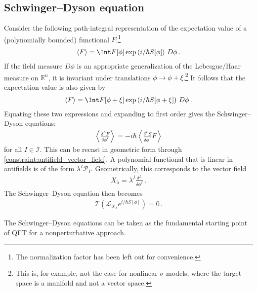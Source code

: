 \subsection{Schwinger--Dyson equation}

    Consider the following path-integral representation of the expectation value of a (polynomially bounded) functional $F$:\footnote{The normalization factor has been left out for convenience.}
    \begin{gather}
        \langle F\rangle = \Int F[\phi]\exp\left(i/\hbar S[\phi]\right)\,D\phi\,.
    \end{gather}
    If the field measure $D\phi$ is an appropriate generalization of the Lebesgue/Haar measure on $\mathbb{R}^n$, it is invariant under translations $\phi\longrightarrow\phi+\xi$.\footnote{This is, for example, not the case for nonlinear $\sigma$-models, where the target space is a manifold and not a vector space.} It follows that the expectation value is also given by
    \begin{gather}
        \langle F\rangle = \Int F[\phi+\xi]\exp\left(i/\hbar S[\phi+\xi]\right)\,D\phi\,.
    \end{gather}
    Equating these two expressions and expanding to first order gives the Schwinger--Dyson equations:
    \begin{gather}
        \label{qft:schwinger_dyson_equations}
        \left\langle\frac{\delta^LF}{\delta\phi^I}\right\rangle = -i\hbar\left\langle\frac{\delta^LS}{\delta\phi^I}F\right\rangle
    \end{gather}
    for all $I\in\mathcal{I}$. This can be recast in geometric form through \cref{constraint:antifield_vector_field}. A polynomial functional that is linear in antifields is of the form $\lambda^I\mathcal{P}_I$. Geometrically, this corresponds to the vector field
    \begin{gather}
        X_\lambda = \lambda^I\frac{\delta^L}{\delta\phi^I}\,.
    \end{gather}
    The Schwinger--Dyson equation then becomes
    \begin{gather}
        \mathcal{T}\left(\mathcal{L}_{X_\lambda}e^{i/\hbar S[\phi]}\right)=0\,.
    \end{gather}
    
    \begin{remark}
        The Schwinger--Dyson equations can be taken as the fundamental starting point of QFT for a nonperturbative approach.
    \end{remark}

